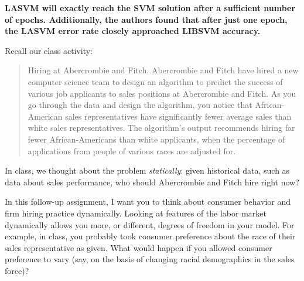 \documentclass[submit]{harvardml}
\newenvironment{answer}{%
    \color{answergreen}\bf}
  {%
  }
\begin{document}
\begin{enumerate}
    \begin{answer}
    LASVM will exactly reach the SVM solution after a sufficient number of epochs. Additionally, the
    authors found that after just one epoch, the LASVM error rate closely approached LIBSVM
    accuracy.
    \end{answer}

\end{enumerate}




\newpage
\begin{problem}
Recall our class activity:
\begin{quote}
Hiring at Abercrombie and Fitch. Abercrombie and Fitch have hired a new computer science team to design an algorithm to predict the success of various job applicants to sales positions at Abercrombie and Fitch. As you go through the data and design the algorithm, you notice that African-American sales representatives have significantly fewer average sales than white sales representatives. The algorithm's output recommends hiring far fewer African-Americans than white applicants, when the percentage of applications from people of various races are adjusted for.   
\end{quote}

In class, we thought about the problem \textit{statically}: given historical data, such as data about sales performance, who should Abercrombie and Fitch hire right now? 

In this follow-up assignment, I want you to think about consumer behavior and firm hiring practice dynamically. Looking at features of the labor market dynamically allows you more, or different, degrees of freedom in your model. For example, in class, you probably took consumer preference about the race of their sales representative as given. What would happen if you allowed consumer preference to vary (say, on the basis of changing racial demographics in the sales force)?  


\end{problem}
\end{document}
